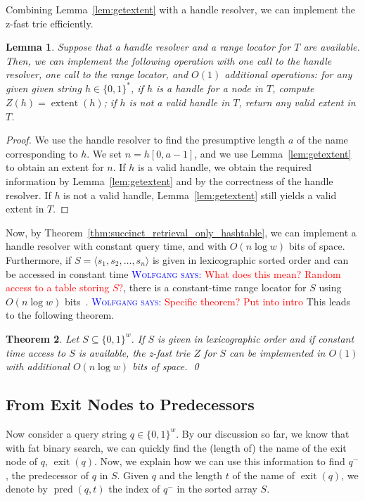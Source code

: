 \documentclass[a4paper,11pt]{article}
\newtheorem{theorem}{Theorem}[section]
\newtheorem{lemma}[theorem]{Lemma}
\newcommand{\?}{\mskip1.5mu}
\DeclareMathOperator{\exit}{exit}
\DeclareMathOperator{\extent}{extent}
\DeclareMathOperator{\pred}{pred}
\newcommand{\aremark}[3]{\textcolor{blue}{\textsc{#1 #2:}}
  \textcolor{red}{\textsf{#3}}}
\newcommand{\wolfgang}[2][says]{\aremark{Wolfgang}{#1}{#2}}
\begin{document}
Combining Lemma~\ref{lem:getextent} with a handle resolver,
we can implement the z-fast trie efficiently.

\begin{lemma}\label{lem:implementz}
Suppose that a handle resolver and a range locator for $T$ are 
available. Then, 
we can implement the following operation with one call to the
handle resolver, one call to the range locator, and $O(1)$
additional operations:
for any given given string $h \in \{0, 1\}^*$,
if $h$ is a handle for a node in $T$, compute
$Z(h) = \extent(h)$; 
if $h$ is not a valid handle in $T$, return
any valid extent in $T$.
\end{lemma}

\begin{proof}
We use the handle resolver to find the presumptive length
$a$ of the name corresponding to $h$.
We set $n = h[0, a - 1]$,  
and  we use Lemma~\ref{lem:getextent}
to obtain an extent for $n$.
If $h$ is a valid handle, we obtain the required information by
Lemma~\ref{lem:getextent} and by the correctness of the handle 
resolver. If $h$ is not a valid handle, 
Lemma~\ref{lem:getextent} still yields a valid extent in $T$.
\end{proof}

Now, by Theorem~\ref{thm:succinct_retrieval_only_hashtable},
we can implement a handle resolver with constant 
query time, and with $O(n \log w)$ bits of 
space.  Furthermore, if $S = \langle s_1, s_2, \dots, s_n\rangle$ 
is given in lexicographic sorted order and can be accessed in
constant time \wolfgang{What does this mean? Random access to 
a table storing $S$?},
there is a constant-time range locator for $S$ using $O(n\log w)$
bits~\cite{BelazzouguiBoPaVi09}.
\wolfgang{Specific theorem? Put into intro}
This leads to the following theorem.

\begin{theorem}
\label{th:zfast}
Let $S \subseteq \{0, 1\}^w$.
If $S$ is given in lexicographic order and if constant time
access to $S$ is available, the z-fast trie $Z$ for $S$ can be
implemented in $O(1)$ with additional $O(n\log w)$ bits of space.
\qed
\end{theorem}

\subsection{From Exit Nodes to Predecessors}

Now consider a query string $q \in \{0, 1\}^w$.
By our discussion so far, we know that
with fat binary search, we can quickly find the 
(length of) the name of the exit node of $q$, $\exit(q)$. 
Now, we explain how we can use this
information to find $q^-$, the predecessor of $q$ in $S$.
Given $q$ and the length $t$ of the name of $\exit(q)$, 
we denote by  $\pred(q, t)$ the index of $q^-$
in the sorted array $S$.
\end{document}
